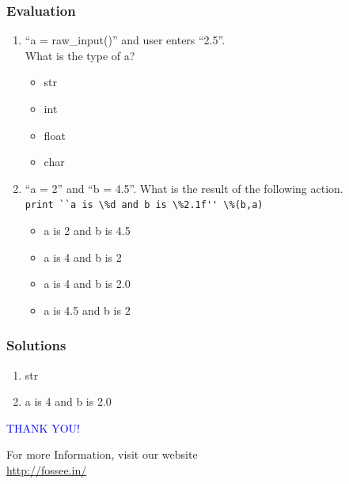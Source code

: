 \documentclass[presentation]{beamer}
\begin{document}
\begin{frame}
\frametitle{Evaluation}
\label{sec-8}


\begin{enumerate}
\item ``a = raw\_input()'' and user enters ``2.5''.\\
   What is the type of a?
\begin{itemize}
\item str
\item int
\item float
\item char
\end{itemize}
\vspace{5pt}
\item ``a = 2'' and ``b = 4.5''. 
   What is the result of the following action.\\
  \verb~print ``a is \%d and b is \%2.1f'' \%(b,a)~ 
\begin{itemize}
\item a is 2 and b is 4.5
\item a is 4 and b is 2
\item a is 4 and b is 2.0
\item a is 4.5 and b is 2
\end{itemize}
\end{enumerate}
\end{frame}
\begin{frame}
\frametitle{Solutions}
\label{sec-9}


\begin{enumerate}
\item str
\vspace{12pt}
\item a is 4 and b is 2.0
\end{enumerate}
\end{frame}
\begin{frame}

  \begin{block}{}
  \begin{center}
  \textcolor{blue}{\Large THANK YOU!} 
  \end{center}
  \end{block}
\begin{block}{}
  \begin{center}
    For more Information, visit our website\\
    \url{http://fossee.in/}
  \end{center}  
  \end{block}
\end{frame}
\end{document}
